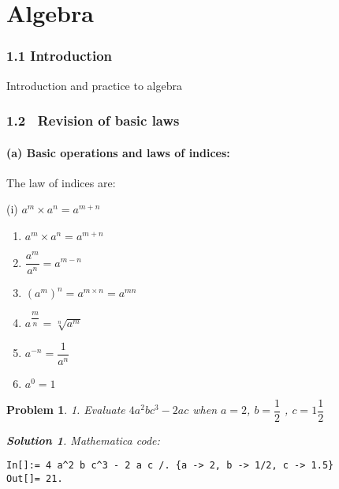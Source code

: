 \documentclass{article}
\newtheorem{problem}[theorem]{Problem}
\newtheorem{solution}[theorem]{Solution}
\begin{document}
\part{Algebra}

\section{1.1 Introduction}

Introduction and practice to algebra

\section{1.2 \ Revision of basic laws}

\subsection{(a) Basic operations and laws of indices:}

The law of indices are:

(i) $a^{m}\times a^{n}=a^{m+n}$

\begin{enumerate}
\item $a^{m}\times a^{n}=a^{m+n}$

\item $\dfrac{a^{m}}{a^{n}}=a^{m-n}$

\item $\left( a^{m}\right) ^{n}=a^{m\times n}=a^{mn}$

\item $a^{\dfrac{m}{n}}=\sqrt[n]{a^{m}}$

\item $a^{-n}=\dfrac{1}{a^{n}}$

\item $a^{0}=1$
\end{enumerate}

\begin{problem}
1. Evaluate $4a^{2}bc^{3}-2ac$ when $a=2$, $b=\dfrac{1}{2}$ , $c=1\dfrac{1}{2%
}$

\begin{solution}
Mathematica code:
\end{solution}
\end{problem}

\begin{verbatim}
In[]:= 4 a^2 b c^3 - 2 a c /. {a -> 2, b -> 1/2, c -> 1.5}
Out[]= 21.
 
\end{verbatim}
\end{document}
